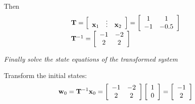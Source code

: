 Then
\[
\begin{array}{l}
 {\bf{T}} = \left[ {\begin{array}{*{20}c}
   {{\bf{x}}_1 } &  \vdots  & {{\bf{x}}_2 }  \\
\end{array}} \right] = \left[ {\begin{array}{*{20}c}
   1 & 1  \\
   { - 1} & { - 0.5}  \\
\end{array}} \right] \\ 
 {\bf{T}}^{ - 1}  = \left[ {\begin{array}{*{20}c}
   { - 1} & { - 2}  \\
   2 & 2  \\
\end{array}} \right] \\ 
 \end{array}
\]



\emph{Finally solve the state equations of the transformed system} 

Transform the initial states:
\[
{\bf{w}}_0  = {\bf{T}}^{ - 1} {\bf{x}}_0  = \left[ {\begin{array}{*{20}c}
   { - 1} & { - 2}  \\
   2 & 2  \\
\end{array}} \right]\left[ {\begin{array}{*{20}c}
   1  \\
   0  \\
\end{array}} \right] = \left[ {\begin{array}{*{20}c}
   { - 1}  \\
   2  \\
\end{array}} \right]
\]

